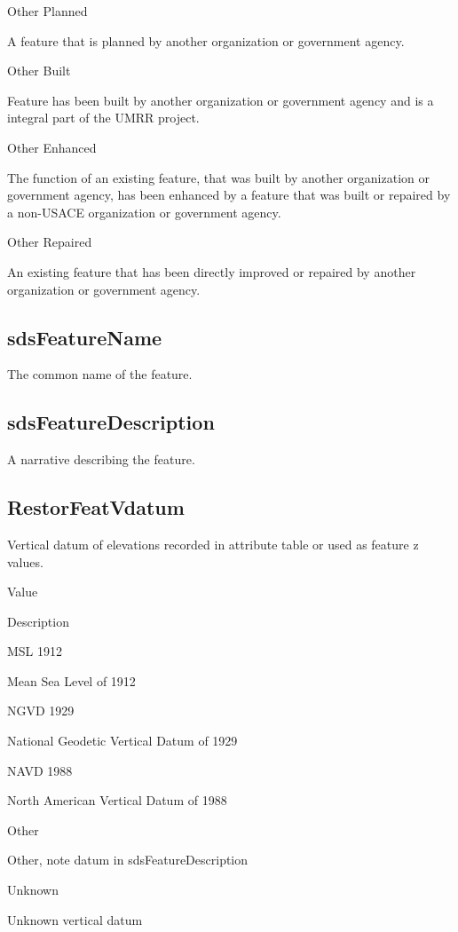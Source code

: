\documentclass[
  letterpaper,
  DIV=11,
  numbers=noendperiod]{scrreprt}
\begin{document}
Other Planned

A feature that is planned by another organization or government agency.

Other Built

Feature has been built by another organization or government agency and
is a integral part of the UMRR project.

Other Enhanced

The function of an existing feature, that was built by another
organization or government agency, has been enhanced by a feature that
was built or repaired by a non-USACE organization or government agency.

Other Repaired

An existing feature that has been directly improved or repaired by
another organization or government agency.

\subsection{sdsFeatureName}\label{sdsfeaturename-17}

The common name of the feature.

\subsection{sdsFeatureDescription}\label{sdsfeaturedescription-17}

A narrative describing the feature.

\subsection{RestorFeatVdatum}\label{restorfeatvdatum-17}

Vertical datum of elevations recorded in attribute table or used as
feature z values.

Value

Description

MSL 1912

Mean Sea Level of 1912

NGVD 1929

National Geodetic Vertical Datum of 1929

NAVD 1988

North American Vertical Datum of 1988

Other

Other, note datum in sdsFeatureDescription

Unknown

Unknown vertical datum
\end{document}
